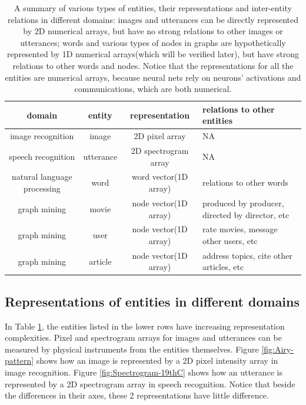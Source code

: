 \documentclass{article}
\begin{document}
\begin{table}[h]
	\centering
	\begin{tabularx}{\textwidth}{ |c|c|c|X| }
		\hline domain & entity & representation & relations to other entities \\ 
		\hline image recognition & image & 2D pixel array & NA \\ 
		\hline speech recognition & utterance & 2D spectrogram array & NA \\ 
		\hline natural language processing & word & word vector(1D array) & relations to other words \\ 
		\hline graph mining & movie & node vector(1D array) & produced by producer, directed by director, etc \\ 
		\hline graph mining & user & node vector(1D array) & rate movies, message other users, etc \\ 
		\hline graph mining & article & node vector(1D array) & address topics, cite other articles, etc \\
		\hline
	\end{tabularx}
	\caption{A summary of various types of entities, their representations and inter-entity relations in different domains: images and utterances can be directly represented by 2D numerical arrays, but have no strong relations to other images or utterances; words and various types of nodes in graphs are  hypothetically represented by 1D numerical arrays(which will be verified later), but have strong relations to other words and nodes. Notice that the representations for all the entities are numerical arrays, because neural nets rely on neurons' activations and communications, which are both numerical.}
	\label{tab:domains}
\end{table}

\subsection{Representations of entities in different domains}
In Table \ref{tab:domains}, the entities listed in the lower rows have increasing representation complexities. Pixel and spectrogram arrays for images and utterances can be measured by physical instruments from the entities themselves. Figure \ref{fig:Airy-pattern} shows how an image is represented by a 2D pixel intensity array in image recognition. Figure \ref{fig:Spectrogram-19thC} shows how an utterance is represented by a 2D spectrogram array in speech recognition. Notice that beside the differences in their axes, these 2 representations have little difference.
\end{document}
